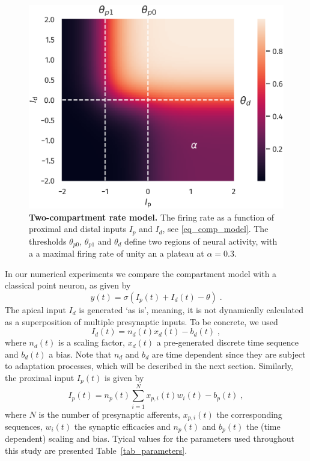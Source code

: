 \documentclass[utf8]{frontiersSCNS} %
\begin{document}
\begin{figure}[t]
\centering
\includegraphics[width=0.6\columnwidth]{plot_comp_mod_marks.png}
\caption{{\bf Two-compartment rate model.} 
The firing rate as a function of proximal and distal 
inputs $I_p$ and $I_d$, 
see \eqref{eq_comp_model}. 
The thresholds $\theta_{p0}$, $\theta_{p1}$ and 
$\theta_d$ define two regions of neural activity,
with a a maximal firing rate of unity an a plateau
at $\alpha=0.3$.}
\label{fig_comp_model}
\end{figure}

In our numerical experiments we compare 
the compartment model with a classical point 
neuron, as given by
\begin{equation}
y(t) = \sigma\left(I_p(t) + I_d(t) - 
\theta \right) \; .
\label{eq_point_neuron}
\end{equation}
The apical input $I_d$ is generated
`as is', meaning, it is not dynamically 
calculated as a superposition of multiple 
presynaptic inputs. To be concrete, we
used
\begin{equation}
I_d(t) = n_d(t) x_d(t) - b_d(t) \; ,
\label{eq_I_d}
\end{equation}
where $n_d(t)$ is a scaling factor, $x_d(t)$ 
a pre-generated discrete time sequence and 
$b_d(t)$ a bias. Note that $n_d$ and $b_d$ 
are time dependent since they are subject 
to adaptation processes, which will be
described in the next section. Similarly, 
the proximal input $I_p(t)$ is given by
\begin{equation}
I_p(t) = n_p(t) \sum_{i=1}^{N} 
x_{p,i}(t) w_i(t) - b_p(t) \; ,
\label{eq_I_p}
\end{equation}
where $N$ is the number of presynaptic afferents, 
$x_{p,i}(t)$ the corresponding sequences, 
$w_i(t)$ the synaptic efficacies and
$n_p(t)$ and $b_p(t)$ the (time dependent)
scaling and bias. Tyical values for the 
parameters used throughout this study
are presented Table~\ref{tab_parameters}.
\end{document}
